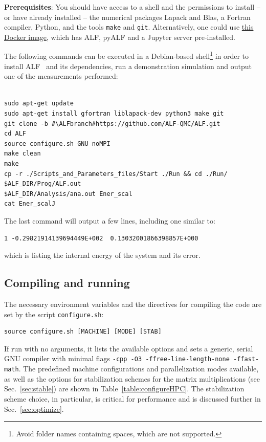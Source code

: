 \textbf{Prerequisites}:
You should have access to a shell and the permissions to install -- or have already installed -- the numerical packages Lapack and Blas, a Fortran compiler, Python, and the tools \texttt{make} and \texttt{git}.
Alternatively, one could use \href{https://hub.docker.com/r/alfcollaboration/jupyter-pyalf-full}{this Docker image}, which has ALF, pyALF and a Jupyter server pre-installed.

The following commands can be executed in a Debian-based shell\footnote{Avoid folder names containing spaces, which are not supported.} in order to install ALF~\ALFver{} and its dependencies, run a demonstration simulation and output one of the measurements performed:

\vspace{-\baselineskip}
\begin{lstlisting}[style=bash,escapechar=\#]

sudo apt-get update
sudo apt-get install gfortran liblapack-dev python3 make git
git clone -b #\ALFbranch#https://github.com/ALF-QMC/ALF.git
cd ALF
source configure.sh GNU noMPI
make clean
make
cp -r ./Scripts_and_Parameters_files/Start ./Run && cd ./Run/
$ALF_DIR/Prog/ALF.out
$ALF_DIR/Analysis/ana.out Ener_scal
cat Ener_scalJ
\end{lstlisting}
The last command will output a few lines, including one similar to:
\begin{lstlisting}[style=bash]
          1 -0.29821914139694449E+002  0.13032001866398857E+000
\end{lstlisting}
which is listing the internal energy of the system and its error.

\subsection{Compiling and running}
\label{sec:compilation}

The necessary environment variables and the directives for compiling the code are set by the script \texttt{configure.sh}:
\begin{lstlisting}[style=bash]
source configure.sh [MACHINE] [MODE] [STAB]
\end{lstlisting}
If run with no arguments, it lists the available options and sets a generic, serial GNU compiler with minimal flags \texttt{-cpp -O3 -ffree-line-length-none -ffast-math}. The predefined machine configurations and parallelization modes available, as well as the options for stabilization schemes for the matrix multiplications (see Sec.~\ref{sec:stable}) are shown in Table~\ref{table:configureHPC}. The stabilization scheme choice, in particular, is critical for performance and is discussed further in Sec.~\ref{sec:optimize}.

